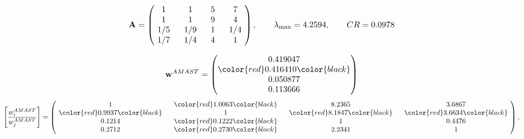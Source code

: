 \begin{example}
\begin{equation*}
\mathbf{A} =
\begin{pmatrix}
$\,\,$ 1 $\,\,$ & $\,\,$1$\,\,$ & $\,\,$5$\,\,$ & $\,\,$7 $\,\,$ \\
$\,\,$ 1 $\,\,$ & $\,\,$ 1 $\,\,$ & $\,\,$9$\,\,$ & $\,\,$4 $\,\,$ \\
$\,\,$ 1/5$\,\,$ & $\,\,$ 1/9$\,\,$ & $\,\,$ 1 $\,\,$ & $\,\,$ 1/4 $\,\,$ \\
$\,\,$ 1/7$\,\,$ & $\,\,$ 1/4$\,\,$ & $\,\,$4$\,\,$ & $\,\,$ 1  $\,\,$ \\
\end{pmatrix},
\qquad
\lambda_{\max} =
4.2594,
\qquad
CR = 0.0978
\end{equation*}

\begin{equation*}
\mathbf{w}^{AMAST} =
\begin{pmatrix}
0.419047\\
\color{red} 0.416410\color{black} \\
0.050877\\
0.113666
\end{pmatrix}\end{equation*}
\begin{equation*}
\left[ \frac{{w}^{AMAST}_i}{{w}^{AMAST}_j} \right] =
\begin{pmatrix}
$\,\,$ 1 $\,\,$ & $\,\,$\color{red} 1.0063\color{black} $\,\,$ & $\,\,$8.2365$\,\,$ & $\,\,$3.6867$\,\,$ \\
$\,\,$\color{red} 0.9937\color{black} $\,\,$ & $\,\,$ 1 $\,\,$ & $\,\,$\color{red} 8.1847\color{black} $\,\,$ & $\,\,$\color{red} 3.6634\color{black}   $\,\,$ \\
$\,\,$0.1214$\,\,$ & $\,\,$\color{red} 0.1222\color{black} $\,\,$ & $\,\,$ 1 $\,\,$ & $\,\,$0.4476 $\,\,$ \\
$\,\,$0.2712$\,\,$ & $\,\,$\color{red} 0.2730\color{black} $\,\,$ & $\,\,$2.2341$\,\,$ & $\,\,$ 1  $\,\,$ \\
\end{pmatrix},
\end{equation*}


\end{example}
